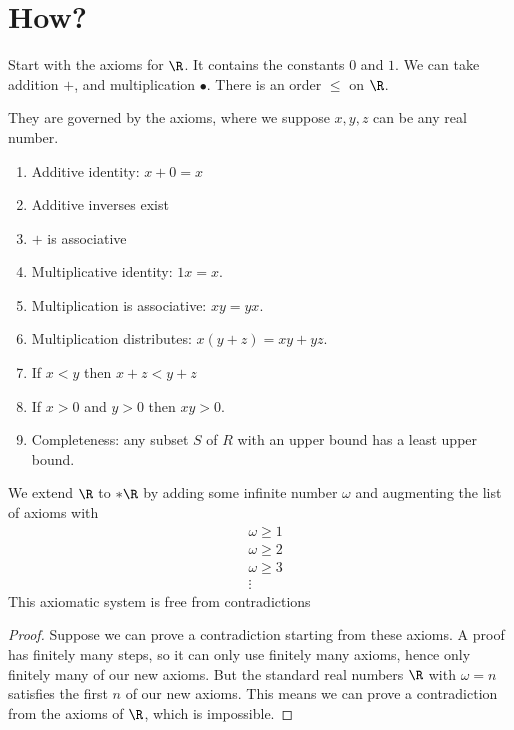 \documentclass{scrartcl}
\begin{document}
\section{How?}
Start with the axioms for $\R$. It contains the constants $0$ and $1$. We can take addition $+$, and multiplication $\bullet$. There is an order $\leq$ on $\R$.  

They are governed by the axioms, where we suppose $x,y,z$ can be any real number.
\begin{enumerate}
\item Additive identity:  $x+0=x$
\item Additive inverses exist
\item $+$ is associative
\item Multiplicative identity: $1x=x$.
\item Multiplication is associative: $xy =yx$. 
\item Multiplication distributes: $x(y+z)=xy+yz$. 
\item If $x < y$ then $x+z < y+ z$
\item If $x > 0$ and $y > 0$ then $xy > 0$. 
\item Completeness: any subset $S$ of $R$ with an upper bound has a least upper bound. 
\end{enumerate}

\begin{theorem}
  We extend $\R$ to $*\R$ by adding some infinite number $\omega$ and augmenting the list of axioms with
  \begin{align*}
    &\omega \geq 1\\
    &\omega \geq 2\\
    &\omega \geq 3\\
    &\vdots
  \end{align*}
  This axiomatic system is free from contradictions
\end{theorem}
\begin{proof}
  Suppose we can prove a contradiction starting from these axioms. A proof has finitely many steps, so it can only use finitely many axioms, hence only finitely many of our new axioms. But the standard real numbers $\R$ with $\omega=n$ satisfies the first $n$ of our new axioms. This means we can prove a contradiction from the axioms of $\R$, which is impossible. 
\end{proof}
\end{document}
